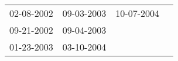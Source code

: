 \begin{supertabular}{llll}
 02-08-2002 &  09-03-2003 &  10-07-2004 \\
 09-21-2002 &  09-04-2003 &             \\
 01-23-2003 &  03-10-2004 &             \\
\end{supertabular}
